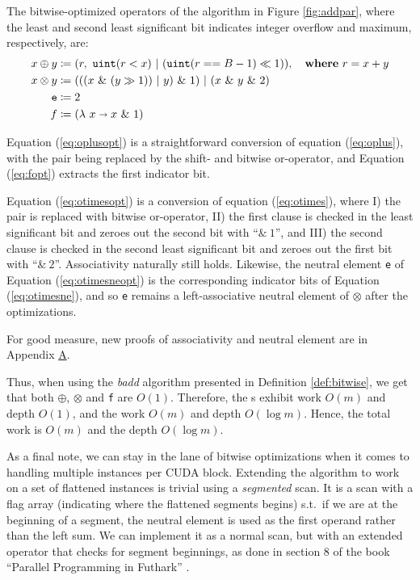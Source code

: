 \begin{definition}\label{def:bitwise}
  The bitwise-optimized operators of the algorithm in Figure \ref{fig:addpar},
  where the least and second least significant bit indicates integer overflow
  and maximum, respectively, are:
\begin{align}
  \label{eq:oplusopt}
  x \oplus y &\coloneq (r,~\mathtt{uint}(r < x)~|~(\mathtt{uint}(r == B-1) \ll 1)),\quad\textbf{where}~r = x + y \\
  \label{eq:otimesopt}
  x \otimes y &\coloneq (((x~\&~(y \gg 1))~|~y)~\&~1)~|~(x~\&~y~\&~2)\\
  \label{eq:otimesneopt}
  \mathtt{e} &\coloneq 2\\
  \label{eq:fopt}
  f &\coloneq (\lambda~x \shortrightarrow x~\&~1)
\end{align}
\end{definition}

Equation (\ref{eq:oplusopt}) is a straightforward conversion of equation
(\ref{eq:oplus}), with the pair being replaced by the shift- and bitwise
or-operator, and Equation (\ref{eq:fopt}) extracts the first indicator bit.

Equation (\ref{eq:otimesopt}) is a conversion of equation (\ref{eq:otimes}),
where I) the pair is replaced with bitwise or-operator, II) the first clause is
checked in the least significant bit and zeroes out the second bit with
``$\&~1$'', and III) the second clause is checked in the second least
significant bit and zeroes out the first bit with ``$\&~2$''. Associativity
naturally still holds. Likewise, the neutral element \texttt{e} of Equation
(\ref{eq:otimesneopt}) is the corresponding indicator bits of Equation
(\ref{eq:otimesne}), and so \texttt{e} remains a left-associative neutral
element of $\otimes$ after the optimizations.

For good measure, new proofs of associativity and neutral element are in
Appendix \hyperref[app:A]{A}.

Thus, when using the \textit{badd} algorithm presented in Definition
\ref{def:bitwise}, we get that both $\oplus$, $\otimes$ and \texttt{f} are
$O(1)$. Therefore, the s exhibit work $O(m)$ and depth $O(1)$, and the
 work $O(m)$ and depth $O(\log m)$. Hence, the total work is $O(m)$ and
the depth $O(\log m)$.

As a final note, we can stay in the lane of bitwise optimizations when it comes
to handling multiple instances per CUDA block. Extending the algorithm to work
on a set of flattened instances is trivial using a \textit{segmented} scan. It
is a scan with a flag array (indicating where the flattened segments begins)
s.t.\ if we are at the beginning of a segment, the neutral element is used as the
first operand rather than the left sum.  We can implement it as a normal scan,
but with an extended operator that checks for segment beginnings, as done in
section 8 of the book ``Parallel Programming in Futhark''
\cite{ParallelProgrammingInFuthark}.

